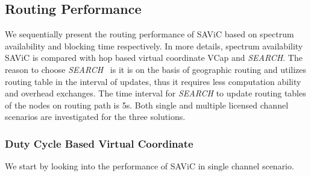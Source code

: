 \subsection{Routing Performance}
We sequentially present the routing performance of SAViC based on spectrum availability and blocking time respectively.
In more details, spectrum availability SAViC is compared with hop based virtual coordinate VCap and \textit{SEARCH}.
The reason to choose \textit{SEARCH}~\cite{search_geo_routing_chowdhury} is it is on the basis of geographic routing and utilizes routing table in the interval of updates, thus it requires less computation ability and overhead exchanges.
The time interval for \textit{SEARCH} to update routing tables of the nodes on routing path is 5s.
Both single and multiple licensed channel scenarios are investigated for the three solutions.

\subsubsection*{Duty Cycle Based Virtual Coordinate} \mbox{}


We start by looking into the performance of SAViC in single channel scenario.


